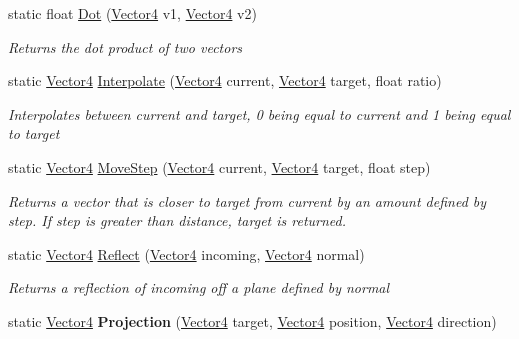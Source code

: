 \begin{DoxyCompactItemize}
\item 
static float \hyperlink{struct_engine_1_1_vector4_a5c5364c6c7fcd342af714354bde1456b}{Dot} (\hyperlink{struct_engine_1_1_vector4}{Vector4} v1, \hyperlink{struct_engine_1_1_vector4}{Vector4} v2)
\begin{DoxyCompactList}\small\item\em Returns the dot product of two vectors \end{DoxyCompactList}\item 
static \hyperlink{struct_engine_1_1_vector4}{Vector4} \hyperlink{struct_engine_1_1_vector4_a1579746fde3ca6d1c06bcbc8b5cbeb2d}{Interpolate} (\hyperlink{struct_engine_1_1_vector4}{Vector4} current, \hyperlink{struct_engine_1_1_vector4}{Vector4} target, float ratio)
\begin{DoxyCompactList}\small\item\em Interpolates between current and target, 0 being equal to current and 1 being equal to target \end{DoxyCompactList}\item 
static \hyperlink{struct_engine_1_1_vector4}{Vector4} \hyperlink{struct_engine_1_1_vector4_a9581d0989caf7079e5a683da764d81f7}{Move\-Step} (\hyperlink{struct_engine_1_1_vector4}{Vector4} current, \hyperlink{struct_engine_1_1_vector4}{Vector4} target, float step)
\begin{DoxyCompactList}\small\item\em Returns a vector that is closer to target from current by an amount defined by step. If step is greater than distance, target is returned. \end{DoxyCompactList}\item 
static \hyperlink{struct_engine_1_1_vector4}{Vector4} \hyperlink{struct_engine_1_1_vector4_ae593fe1812b7c9f8fc2f69ba1fd32c86}{Reflect} (\hyperlink{struct_engine_1_1_vector4}{Vector4} incoming, \hyperlink{struct_engine_1_1_vector4}{Vector4} normal)
\begin{DoxyCompactList}\small\item\em Returns a reflection of incoming off a plane defined by normal \end{DoxyCompactList}\item 
\hypertarget{struct_engine_1_1_vector4_afc749588fe37574c3f2bc371f685acca}{static \hyperlink{struct_engine_1_1_vector4}{Vector4} {\bfseries Projection} (\hyperlink{struct_engine_1_1_vector4}{Vector4} target, \hyperlink{struct_engine_1_1_vector4}{Vector4} position, \hyperlink{struct_engine_1_1_vector4}{Vector4} direction)}\label{struct_engine_1_1_vector4_afc749588fe37574c3f2bc371f685acca}


\end{DoxyCompactItemize}
